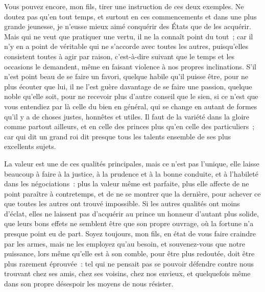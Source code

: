 \documentclass[french,twoside]{book} %
\begin{document}
Vous pouvez encore, mon fils, tirer une instruction de ces deux exemples. Ne doutez pas qu’en tout temps, et surtout en ces commencements et dans une plus grande jeunesse, je n’eusse mieux aimé conquérir des États que de les acquérir. Mais qui ne veut que pratiquer une vertu, il ne la connaît point du tout ; car il n’y en a point de véritable qui ne s’accorde avec toutes les autres, puisqu’elles consistent toutes à agir par raison, c’est-à-dire suivant que le temps et les occasions le demandent, même en faisant violence à nos propres inclinations. S’il n’est point beau de se faire un favori, quelque habile qu’il puisse être, pour ne plus écouter que lui, il ne l’est guère davantage de se faire une passion, quelque noble qu’elle soit, pour ne recevoir plus d’autre conseil que le sien, si ce n’est que vous entendiez par là celle du bien en général, qui se change en autant de formes qu’il y a de choses justes, honnêtes et utiles. Il faut de la variété dans la gloire comme partout ailleurs, et en celle des princes plus qu’en celle des particuliers ; car qui dit un grand roi dit presque tous les talents ensemble de ses plus excellents sujets.\par
La valeur est une de ces qualités principales, mais ce n’est pas l’unique, elle laisse beaucoup à faire à la justice, à la prudence et à la bonne conduite, et à l’habileté dans les négociations : plus la valeur même est parfaite, plus elle affecte de ne point paraître à contretemps, et de ne se montrer que la dernière, pour achever ce que toutes les autres ont trouvé impossible. Si les autres qualités ont moins d’éclat, elles ne laissent pas d’acquérir au prince un honneur d’autant plus solide, que leurs bons effets ne semblent être que son propre ouvrage, où la fortune n’a presque point eu de part. Soyez toujours, mon fils, en état de vous faire craindre par les armes, mais ne les employez qu’au besoin, et souvenez-vous que notre puissance, lors même qu’elle est à son comble, pour être plus redoutée, doit être plus rarement éprouvée : tel qui ne pensait pas se pouvoir défendre contre nous trouvant chez ses amis, chez ses voisins, chez nos envieux, et quelquefois même dans son propre désespoir les moyens de nous résister.
\end{document}
